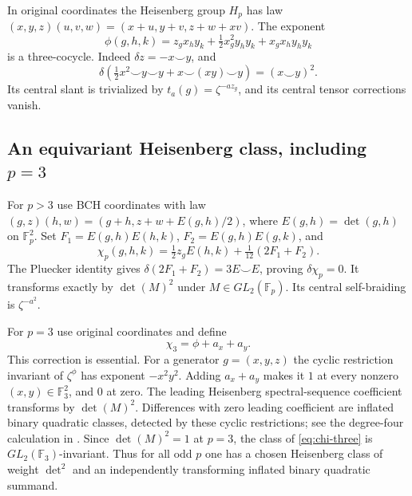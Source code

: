 \documentclass[11pt]{amsart}
\theoremstyle{definition}\newtheorem{definition}[theorem]{Definition}
\newcommand{\Fp}{\mathbb F_p}
\begin{document}
In original coordinates the Heisenberg group $H_p$ has law
$(x,y,z)(u,v,w)=(x+u,y+v,z+w+xv)$. The exponent
\begin{equation}\label{eq:phi}
\phi(g,h,k)=z_gx_hy_k+\tfrac12x_g^2y_hy_k+x_gx_hy_hy_k
\end{equation}
is a three-cocycle. Indeed $\delta z=-x\smile y$, and
\[
\delta(\tfrac12x^2\smile y\smile y+x\smile(xy)\smile y)
=(x\smile y)^2.
\]
Its central slant is trivialized by $t_a(g)=\zeta^{-a z_g}$, and its central
tensor corrections vanish.

\subsection{An equivariant Heisenberg class, including $p=3$}
For $p>3$ use BCH coordinates with law
$(g,z)(h,w)=(g+h,z+w+E(g,h)/2)$, where $E(g,h)=\det(g,h)$ on $\Fp^2$.
Set $F_1=E(g,h)E(h,k)$, $F_2=E(g,h)E(g,k)$, and
\begin{equation}\label{eq:chi-large}
\chi_p(g,h,k)=\tfrac12z_gE(h,k)+\tfrac1{12}(2F_1+F_2).
\end{equation}
The Pluecker identity gives $\delta(2F_1+F_2)=3E\smile E$, proving
$\delta\chi_p=0$. It transforms exactly by $\det(M)^2$ under $M\in GL_2(\Fp)$.
Its central self-braiding is $\zeta^{-a^2}$.

For $p=3$ use original coordinates and define
\begin{equation}\label{eq:chi-three}
\chi_3=\phi+a_x+a_y.
\end{equation}
This correction is essential. For a generator $g=(x,y,z)$ the cyclic
restriction invariant of $\zeta^\phi$ has exponent $-x^2y^2$.
Adding $a_x+a_y$ makes it $1$ at every nonzero $(x,y)\in\mathbb F_3^2$,
and $0$ at zero. The leading Heisenberg spectral-sequence coefficient transforms
by $\det(M)^2$. Differences with zero leading coefficient are inflated binary
quadratic classes, detected by these cyclic restrictions; see the degree-four
calculation in \cite[Section 1.4]{MMU}. Since $\det(M)^2=1$ at $p=3$, the
class of \eqref{eq:chi-three} is $GL_2(\mathbb F_3)$-invariant.
Thus for all odd $p$ one has a chosen Heisenberg class of weight $\det^2$ and
an independently transforming inflated binary quadratic summand.
\end{document}
